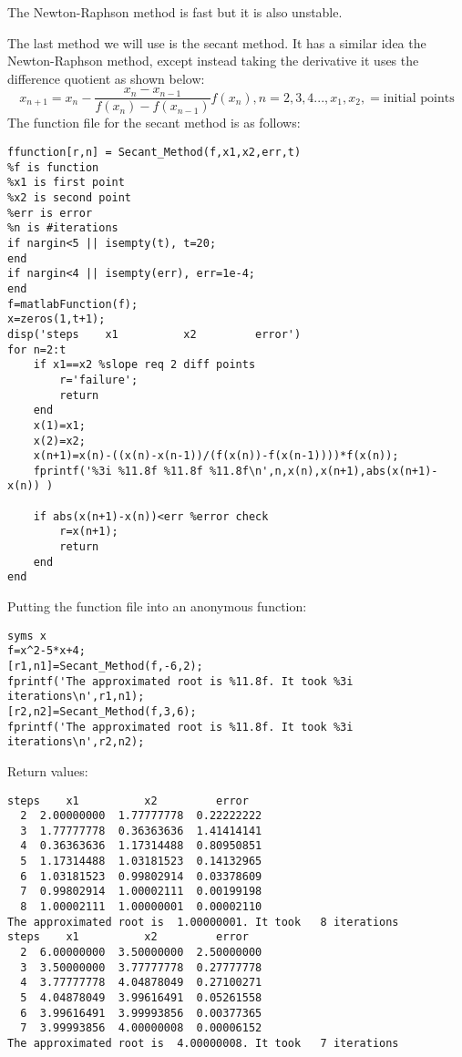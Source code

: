 \documentclass[12pt]{article}
\begin{document}
The Newton-Raphson method is fast but it is also unstable.
\pagebreak


The last method we will use is the secant method. It has a similar idea the Newton-Raphson method, except instead taking the derivative it uses the difference quotient as shown below:
\begin{equation*}
x_{n+1}=x_{n}-\frac{x_{n}-x_{n-1}}{f(x_{n})-f(x_{n-1})}f(x_{n}),n=2,3,4...,x_{1},x_{2},=\mbox{initial points}
\end{equation*}
The function file for the secant method is as follows:
\begin{lstlisting}[style=Matlab-editor]
ffunction[r,n] = Secant_Method(f,x1,x2,err,t)
%f is function
%x1 is first point
%x2 is second point
%err is error
%n is #iterations
if nargin<5 || isempty(t), t=20;
end
if nargin<4 || isempty(err), err=1e-4;
end
f=matlabFunction(f);
x=zeros(1,t+1);
disp('steps    x1          x2         error')
for n=2:t
    if x1==x2 %slope req 2 diff points
        r='failure';
        return
    end
    x(1)=x1;
    x(2)=x2;
    x(n+1)=x(n)-((x(n)-x(n-1))/(f(x(n))-f(x(n-1))))*f(x(n));
    fprintf('%3i %11.8f %11.8f %11.8f\n',n,x(n),x(n+1),abs(x(n+1)-x(n)) )
    
    if abs(x(n+1)-x(n))<err %error check
        r=x(n+1);
        return
    end
end
\end{lstlisting}
Putting the function file into an anonymous function:
\begin{lstlisting}[style=Matlab-editor]
syms x
f=x^2-5*x+4;
[r1,n1]=Secant_Method(f,-6,2);
fprintf('The approximated root is %11.8f. It took %3i iterations\n',r1,n1);
[r2,n2]=Secant_Method(f,3,6);
fprintf('The approximated root is %11.8f. It took %3i iterations\n',r2,n2);

\end{lstlisting}
Return values:
\begin{lstlisting}[style=Matlab-editor]
steps    x1          x2         error
  2  2.00000000  1.77777778  0.22222222
  3  1.77777778  0.36363636  1.41414141
  4  0.36363636  1.17314488  0.80950851
  5  1.17314488  1.03181523  0.14132965
  6  1.03181523  0.99802914  0.03378609
  7  0.99802914  1.00002111  0.00199198
  8  1.00002111  1.00000001  0.00002110
The approximated root is  1.00000001. It took   8 iterations
steps    x1          x2         error
  2  6.00000000  3.50000000  2.50000000
  3  3.50000000  3.77777778  0.27777778
  4  3.77777778  4.04878049  0.27100271
  5  4.04878049  3.99616491  0.05261558
  6  3.99616491  3.99993856  0.00377365
  7  3.99993856  4.00000008  0.00006152
The approximated root is  4.00000008. It took   7 iterations
\end{lstlisting}
\end{document}
